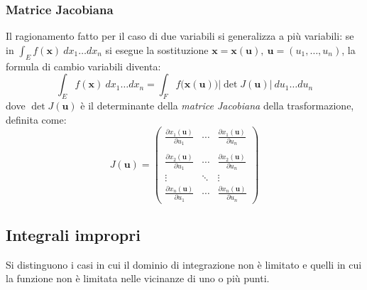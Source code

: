 \documentclass[11pt, a4paper]{scrartcl}
\theoremstyle{definition}
\numberwithin{esempio}{section}
\theoremstyle{definition}
\numberwithin{obs}{section}
\numberwithin{nota}{section}
\numberwithin{equation}{subsection}
\begin{document}
\subsubsection{Matrice Jacobiana}
Il ragionamento fatto per il caso di due variabili si generalizza a pi\`u variabili: se in $\int_{E} f(\mathbf{x} ) \ dx_1 \ldots dx_n$ si esegue la sostituzione $\mathbf{x} = \mathbf{x} (\mathbf{u} ) ,\ \mathbf{u} =(u_1,\ldots,u_n)$, la formula di cambio variabili diventa:
\begin{equation}
	\int_{E} f(\mathbf{x} )\ dx_1\ldots dx_n = \int_{F} f\big(\mathbf{x}(\mathbf{u} ) \big) \lvert \det J(\mathbf{u} ) \rvert\ du_1\ldots du_n
\end{equation}
dove $\det J(\mathbf{u} )$ \`e il determinante della \textit{matrice Jacobiana} della trasformazione, definita come:
\begin{equation}
	J(\mathbf{u} ) = \begin{pmatrix} \displaystyle \frac{\partial x_1(\mathbf{u} )}{\partial u_1} & \cdots &\displaystyle \frac{\partial x_1(\mathbf{u} )}{\partial u_n} \\ &&\\\displaystyle \frac{\partial x_2(\mathbf{u} )}{\partial u_1}& \cdots &\displaystyle \frac{\partial x_2(\mathbf{u} )}{\partial u_n}  \\ \vdots &\ddots & \vdots \\ \displaystyle \frac{\partial x_n(\mathbf{u} )}{\partial u_1} & \cdots &\displaystyle \frac{\partial x_n(\mathbf{u} )}{\partial u_n}\end{pmatrix} 
\end{equation}
\subsection{Integrali impropri}
Si distinguono i casi in cui il dominio di integrazione non \`e limitato e quelli in cui la funzione non \`e limitata nelle vicinanze di uno o pi\`u punti.
\end{document}
